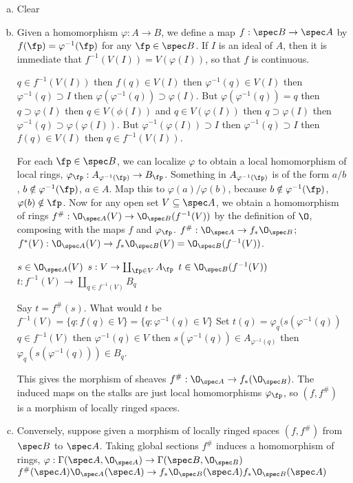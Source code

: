\pf \hfill
\begin{enumerate}[(a)]
\item Clear

\item Given a homomorphism $\varphi: A \to B$, we define a map $f: \spec B \to \spec A$ by $f(\fp)= \varphi^{-1}(\fp)$ for any $\fp \in \spec B$. If $I$ is an ideal of $A$, then it is immediate that $f^{-1}(V(I))= V(\varphi(I))$, so that $f$ is continuous. 

$q \in f^{-1}(V(I))$ then $f(q) \in V(I)$ then $\varphi^{-1}(q) \in V(I)$ then $\varphi^{-1}(q) \supset I$ then $\varphi(\varphi^{-1}(q)) \supset \varphi(I)$. But $\varphi(\varphi^{-1}(q))= q$ then $q \supset \varphi(I)$ then $q \in V(\phi(I))$ and $q \in V(\varphi(I))$ then $q \supset \varphi(I)$ then $\varphi^{-1}(q) \supset \varphi(\varphi(I))$. But $\varphi^{-1}(\varphi(I)) \supset I$ then $\varphi^{-1}(q) \supset I$ then $f(q) \in V(I)$ then $q \in f^{-1}(V(I))$.

For each $\fp \in \spec B$, we can localize $\varphi$ to obtain a local homomorphism of local rings, $\varphi_\fp: A_{\varphi^{-1}(\fp)} \to B_{\fp}$. Something in $A_{\varphi^{-1}(\fp)}$ is of the form $a/b$, $b \notin \varphi^{-1}(\fp)$, $a \in A$. Map this to $\varphi(a)/\varphi(b)$, because $b \notin \varphi^{-1}(\fp)$, $\varphi(b) \notin \fp$. Now for any open set $V \subseteq \spec A$, we obtain a homomorphism of rings $f^\#: \O_{\spec A}(V) \to \O_{\spec B}(f^{-1}(V))$ by the definition of $\O$, composing with the maps $f$ and $\varphi_\fp$. $f^\#: \O_{\spec A} \to f_* \O_{\spec B}$; $f^*(V): \O_{\spec A}(V) \to f_* \O_{\spec B}(V)= \O_{\spec B}(f^{-1}(V))$. 

$s \in \O_{\spec A}(V)$
$s: V \to \coprod_{\fp \in V} A_\fp$
$t \in \O_{\spec B}(f^{-1}(V))$
$t: f^{-1}(V) \to \coprod_{q \in f^{-1}(V)} B_q$

Say $t= f^\#(s)$. What would $t$ be
$f^{-1}(V)= \{ q \colon f(q) \in V \} = \{ q \colon \varphi^{-1}(q) \in V \}$
Set $t(q)= \varphi_q(s(\varphi^{-1}(q))$
$q \in f^{-1}(V)$ then $\varphi^{-1}(q) \in V$
then $s(\varphi^{-1}(q)) \in A_{\varphi^{-1}(q)}$
then $\varphi_q(s(\varphi^{-1}(q))) \in B_q$. 

This gives the morphism of sheaves $f^\#: \O_{\spec A} \to f_*(\O_{\spec B})$. The induced maps on the stalks are just local homomorphisms $\varphi_\fp$, so $(f,f^\#)$ is a morphism of locally ringed spaces. 

\item Conversely, suppose given a morphism of locally ringed spaces $(f,f^\#)$ from $\spec B$ to $\spec A$. Taking global sections $f^\#$ induces a homomorphism of rings, $\varphi: \Gamma(\spec A, \O_{\spec A}) \to \Gamma(\spec B, \O_{\spec B})$
$f^\#(\spec A) \O_{\spec A}(\spec A) \to f_* \O_{\spec B}(\spec A) f_* \O_{\spec B}(\spec A)$


\end{enumerate}
